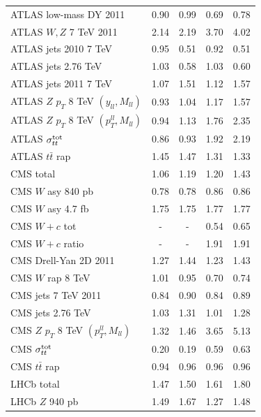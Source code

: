 \begin{table}[t]
\begin{center}
\begin{tabular}{|l|c|c||c|c|}
ATLAS low-mass DY 2011    &    0.90   &   0.99   &   0.69   &   0.78  \\    
ATLAS $W,Z$ 7 TeV 2011    &    2.14   &   2.19   &   3.70   &   4.02  \\    
ATLAS jets 2010 7 TeV     &    0.95   &   0.51   &   0.92   &   0.51  \\    
ATLAS jets 2.76 TeV     &    1.03   &   0.58   &   1.03   &   0.60  \\    
ATLAS jets 2011 7 TeV     &    1.07   &   1.51   &   1.12   &   1.57  \\    
ATLAS $Z$ $p_T$ 8 TeV $(y_{ll},M_{ll})$       &    0.93   &   1.04   &   1.17   &   1.57  \\    
ATLAS $Z$ $p_T$ 8 TeV $(p_T^{ll},M_{ll})$    &    0.94   &   1.13   &   1.76   &   2.35  \\    
ATLAS $\sigma_{tt}^{\rm tot}$     &    0.86   &   0.93   &   1.92   &   2.19  \\    
ATLAS $t\bar{t}$ rap    &    1.45   &   1.47   &   1.31   &   1.33  \\
\hline
CMS total   &    1.06   &   1.19   &   1.20   &   1.43  \\    
CMS $W$ asy 840 pb     &    0.78   &   0.78   &   0.86   &   0.86  \\    
CMS $W$ asy 4.7 fb     &    1.75   &   1.75   &   1.77   &   1.77  \\    
CMS $W+c$ tot    &    -   &   -   &   0.54   &   0.65  \\    
CMS $W+c$ ratio    &    -   &   -   &   1.91   &   1.91  \\    
CMS Drell-Yan 2D 2011    &    1.27   &   1.44   &   1.23   &   1.43  \\    
CMS $W$ rap 8 TeV    &    1.01   &   0.95   &   0.70   &   0.74  \\    
CMS jets 7 TeV 2011     &    0.84   &   0.90   &   0.84   &   0.89  \\    
CMS jets 2.76 TeV    &    1.03   &   1.31   &   1.01   &   1.28  \\    
CMS $Z$ $p_T$ 8 TeV $(p_T^{ll},M_{ll})$    &    1.32   &   1.46   &   3.65   &   5.13  \\    
CMS $\sigma_{tt}^{\rm tot}$     &    0.20   &   0.19  &   0.59   &   0.63  \\    
CMS $t\bar{t}$ rap    &    0.94   &   0.96   &   0.96   &   0.96  \\
\hline
LHCb total   &    1.47   &   1.50   &   1.61   &   1.80  \\    
LHCb $Z$ 940 pb     &    1.49   &   1.67   &   1.27   &   1.48  \\    

\end{tabular}
\end{center}
\end{table}
